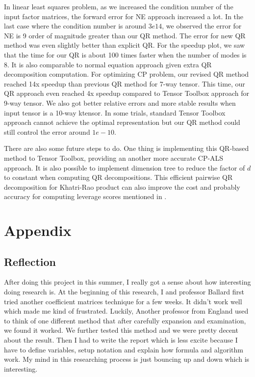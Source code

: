 \documentclass{article}
\begin{document}
In linear least squares problem, as we increased the condition number of the input factor matrices, the forward error for NE approach increased a lot.
In the last case where the condition number is around $3e14$, we observed the error for NE is 9 order of magnitude greater than our QR method.
The error for new QR method was even slightly better than explicit QR.
For the speedup plot, we saw that the time for our QR is about 100 times faster when the number of modes is 8.
It is also comparable to normal equation approach given extra QR decomposition computation.
For optimizing CP problem, our revised QR method reached 14x speedup than previous QR method for 7-way tensor.
This time, our QR approach even reached 4x speedup compared to Tensor Toolbox approach for 9-way tensor.
We also got better relative errors and more stable results when input tensor is a 10-way ktensor.
In some trials, standard Tensor Toolbox approach cannot achieve the optimal representation but our QR method could still control the error around $1e-10$.

There are also some future steps to do. One thing is implementing this QR-based method to Tensor Toolbox, providing an another more accurate CP-ALS approach.
It is also possible to implement dimension tree to reduce the factor of $d$ to constant when computing QR decompositions.
This efficient pairwise QR decomposition for Khatri-Rao product can also improve the cost and probably accuracy for computing leverage scores mentioned in \cite{bharadwaj2023fast}.

\section{Appendix}
\subsection{Reflection}


After doing this project in this summer, I really got a sense about how interesting doing research is.
At the beginning of this research, I and professor Ballard first tried another coefficient matrices technique for a few weeks. 
It didn't work well which made me kind of frustrated. 
Luckily, Another professor from England used to think of one different method that after carefully expansion and examination, we found it worked. 
We further tested this method and we were pretty decent about the result.
Then I had to write the report which is less excite because I have to define variables, setup notation and explain how formula and algorithm work. 
My mind in this researching process is just bouncing up and down which is interesting.
\end{document}
